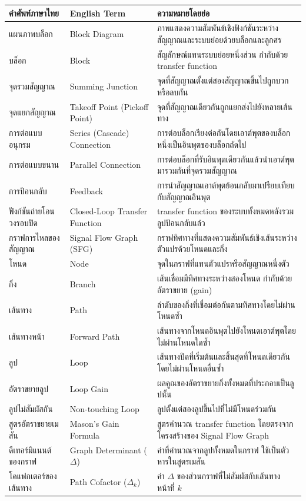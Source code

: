 \begin{table}[htbp]
    \centering
    \begin{tabularx}{\textwidth}{L{0.20\textwidth} L{0.24\textwidth} Y}
        \hline
        \textbf{คำศัพท์ภาษาไทย} & \textbf{English Term} & \textbf{ความหมายโดยย่อ} \\
        \hline
        แผนภาพบล็อก & Block Diagram & ภาพแสดงความสัมพันธ์เชิงฟังก์ชันระหว่างสัญญาณและระบบย่อยด้วยบล็อกและลูกศร \\
        บล็อก & Block & สัญลักษณ์แทนระบบย่อยหนึ่งส่วน กำกับด้วย transfer function \\
        จุดรวมสัญญาณ & Summing Junction & จุดที่สัญญาณตั้งแต่สองสัญญาณขึ้นไปถูกบวกหรือลบกัน \\
        จุดแยกสัญญาณ & Takeoff Point (Pickoff Point) & จุดที่สัญญาณเดียวกันถูกแยกส่งไปยังหลายเส้นทาง \\
        การต่อแบบอนุกรม & Series (Cascade) Connection & การต่อบล็อกเรียงต่อกันโดยเอาต์พุตของบล็อกหนึ่งเป็นอินพุตของบล็อกถัดไป \\
        การต่อแบบขนาน & Parallel Connection & การต่อบล็อกที่รับอินพุตเดียวกันแล้วนำเอาต์พุตมารวมกันที่จุดรวมสัญญาณ \\
        การป้อนกลับ & Feedback & การนำสัญญาณเอาต์พุตย้อนกลับมาเปรียบเทียบกับสัญญาณอินพุต \\
        ฟังก์ชันถ่ายโอนวงรอบปิด & Closed-Loop Transfer Function & transfer function ของระบบทั้งหมดหลังรวมลูปป้อนกลับแล้ว \\
        กราฟการไหลของสัญญาณ & Signal Flow Graph (SFG) & กราฟทิศทางที่แสดงความสัมพันธ์เชิงเส้นระหว่างตัวแปรด้วยโหนดและกิ่ง \\
        โหนด & Node & จุดในกราฟที่แทนตัวแปรหรือสัญญาณหนึ่งตัว \\
        กิ่ง & Branch & เส้นเชื่อมมีทิศทางระหว่างสองโหนด กำกับด้วยอัตราขยาย (gain) \\
        เส้นทาง & Path & ลำดับของกิ่งที่เชื่อมต่อกันตามทิศทางโดยไม่ผ่านโหนดซ้ำ \\
        เส้นทางหน้า & Forward Path & เส้นทางจากโหนดอินพุตไปยังโหนดเอาต์พุตโดยไม่ผ่านโหนดใดซ้ำ \\
        ลูป & Loop & เส้นทางปิดที่เริ่มต้นและสิ้นสุดที่โหนดเดียวกันโดยไม่ผ่านโหนดอื่นซ้ำ \\
        อัตราขยายลูป & Loop Gain & ผลคูณของอัตราขยายกิ่งทั้งหมดที่ประกอบเป็นลูปนั้น \\
        ลูปไม่สัมผัสกัน & Non-touching Loop & ลูปตั้งแต่สองลูปขึ้นไปที่ไม่มีโหนดร่วมกัน \\
        สูตรอัตราขยายเมสัน & Mason's Gain Formula & สูตรคำนวณ transfer function โดยตรงจากโครงสร้างของ Signal Flow Graph \\
        ดีเทอร์มิแนนต์ของกราฟ & Graph Determinant ($\Delta$) & ค่าที่คำนวณจากลูปทั้งหมดในกราฟ ใช้เป็นตัวหารในสูตรเมสัน \\
        โคแฟกเตอร์ของเส้นทาง & Path Cofactor ($\Delta_k$) & ค่า $\Delta$ ของส่วนกราฟที่ไม่สัมผัสกับเส้นทางหน้าที่ $k$ \\
        \hline
    \end{tabularx}
\end{table}


